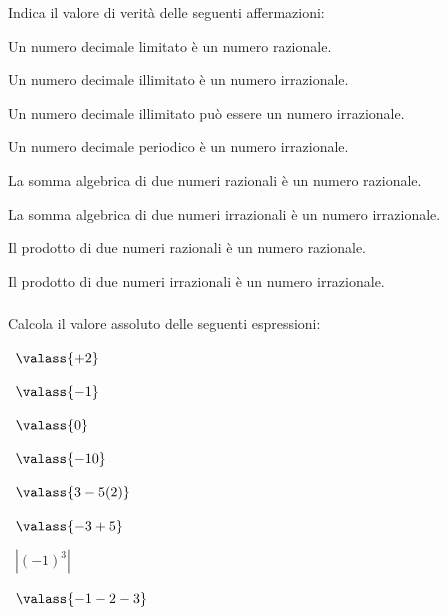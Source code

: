 \pagebreak %

\begin{esercizio}
\label{ese:1.7}
Indica il valore di verità delle seguenti affermazioni:
\begin{enumeratea}
\item Un numero decimale limitato è un numero razionale.
\hfill \verofalso
\item Un numero decimale illimitato è un numero irrazionale.
\hfill \verofalso
\item Un numero decimale illimitato può essere un numero irrazionale.
\hfill \verofalso
\item Un numero decimale periodico è un numero irrazionale.
\hfill \verofalso
\item La somma algebrica di due numeri razionali è un numero razionale.
\hfill \verofalso
\item La somma algebrica di due numeri irrazionali è un numero irrazionale.
\hfill \verofalso
\item Il prodotto di due numeri razionali è un numero razionale.
\hfill \verofalso
\item Il prodotto di due numeri irrazionali è un numero irrazionale.
\hfill \verofalso
\end{enumeratea}
\end{esercizio}

\subsubsection*{}

\begin{esercizio}
\label{ese:1.8}
Calcola il valore assoluto delle seguenti espressioni:
\begin{htmulticols}{4}
\begin{enumeratea}
\item~\(\valass{+2}\)
\item~\(\valass{-1}\)
\item~\(\valass{0}\)
\item~\(\valass{-10}\)
\item~\(\valass{3-5(2)}\)
\item~\(\valass{-3+5}\)
\item~\(\left|{(-1)^3}\right|\)
\item~\(\valass{-1-2-3}\)
\end{enumeratea}
\end{htmulticols}
\end{esercizio}

